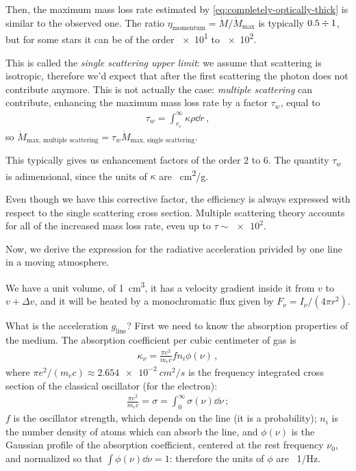 \documentclass[main.tex]{subfiles}
\begin{document}
Then, the maximum mass loss rate estimated by \eqref{eq:completely-optically-thick} is similar to the observed one. The ratio \(\eta _{\text{momentum}} = \dot{M} / \dot{M} _{\text{max}}\) is typically \(0.5 \divisionsymbol 1 \), but for some stars it can be of the order \num{e1} to \num{e2}.

This is called the \emph{single scattering upper limit}: we assume that scattering is isotropic, therefore we'd expect that after the first scattering the photon does not contribute anymore.
This is not actually the case: \emph{multiple scattering} can contribute, enhancing the maximum mass loss rate by a factor \(\tau_{w}\), equal to 
%
\begin{align}
  \tau_{w} = \int _{r_c}^{\infty} \kappa \rho \dd{r} 
\,,
\end{align}
%
so \(\dot{M} _{\text{max, multiple scattering}} =\tau_{w} \dot{M} _{\text{max, single scattering}}\).

This typically gives us enhancement factors of the order \(2\) to \(6\).
The quantity \(\tau _w\) is adimensional, since the units of \(\kappa \) are \SI{}{cm^2/g}.

Even though we have this corrective factor, the efficiency is always expressed with respect to the single scattering cross section.
Multiple scattering theory accounts for all of the increased mass loss rate, even up to \(\tau \sim \num{e2}\).

Now, we derive the expression for the radiative acceleration privided by one line in a moving atmosphere.

We have a unit volume, of \SI{1}{cm^3}, it has a velocity gradient inside it from \(v\) to \(v + \Delta v\), and it will be heated by a monochromatic flux given by \(F_{\nu } = I_{\nu } / (4 \pi r^2)\).

What is the acceleration \(g _{\text{line}}\)?
First we need to know the absorption properties of the medium. 
The absorption coefficient per cubic centimeter of gas is 
%
\begin{align}
  \kappa_{\nu } = \frac{\pi e^2}{m_e c} f n_i \phi (\nu )
\,,
\end{align}
%
where \(\pi e^2/ (m_e c) \approx \SI{2.654e-2}{cm^2/s}\) is the frequency integrated cross section of the classical oscillator (for the electron): 
%
\begin{align}
  \frac{\pi e^2}{m_e c} = \sigma = \int_0^{\infty} \sigma (\nu ) \dd{\nu }
\,;
\end{align}
%
\(f\) is the oscillator strength, which depends on the line (it is a probability);
\(n_i\) is the number density of atoms which can absorb the line, and \(\phi (\nu )\) is the Gaussian profile of the absorption coefficient, centered at the rest frequency \(\nu_0 \), and normalized so that \(\int \phi (\nu ) \dd{\nu } = 1\): therefore the units of \(\phi\) are \SI{}{1/Hz}.
\end{document}
